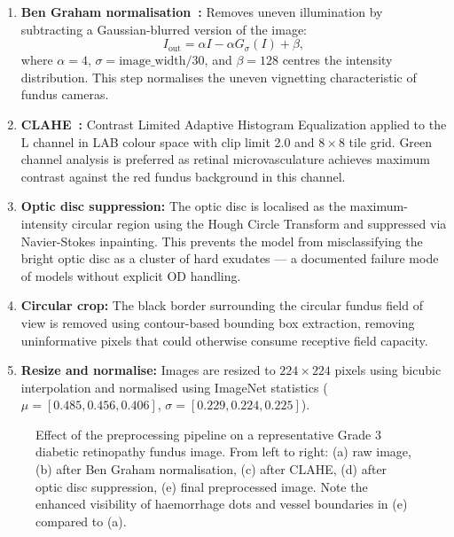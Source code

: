 \documentclass[review,12pt]{elsarticle}
\begin{document}
\begin{enumerate}
  \item \textbf{Ben Graham normalisation~\cite{graham2015}:} Removes uneven
  illumination by subtracting a Gaussian-blurred version of the image:
  \begin{equation}
    I_{\text{out}} = \alpha I - \alpha G_{\sigma}(I) + \beta,
    \label{eq:ben_graham}
  \end{equation}
  where $\alpha = 4$, $\sigma = \text{image\_width}/30$, and $\beta = 128$
  centres the intensity distribution. This step normalises the uneven
  vignetting characteristic of fundus cameras.

  \item \textbf{CLAHE~\cite{zuiderveld1994}:} Contrast Limited Adaptive
  Histogram Equalization applied to the L channel in LAB colour space with clip
  limit 2.0 and $8 \times 8$ tile grid. Green channel analysis is preferred as
  retinal microvasculature achieves maximum contrast against the red fundus
  background in this channel.

  \item \textbf{Optic disc suppression:} The optic disc is localised as the
  maximum-intensity circular region using the Hough Circle Transform and
  suppressed via Navier-Stokes inpainting. This prevents the model from
  misclassifying the bright optic disc as a cluster of hard exudates — a
  documented failure mode of models without explicit OD handling.

  \item \textbf{Circular crop:} The black border surrounding the circular
  fundus field of view is removed using contour-based bounding box extraction,
  removing uninformative pixels that could otherwise consume receptive field
  capacity.

  \item \textbf{Resize and normalise:} Images are resized to $224 \times 224$
  pixels using bicubic interpolation and normalised using ImageNet statistics
  ($\mu = [0.485, 0.456, 0.406]$, $\sigma = [0.229, 0.224, 0.225]$).
\end{enumerate}

\begin{figure}[htbp]
  \centering
  \caption{Effect of the preprocessing pipeline on a representative Grade 3
  diabetic retinopathy fundus image. From left to right: (a) raw image,
  (b) after Ben Graham normalisation, (c) after CLAHE, (d) after optic disc
  suppression, (e) final preprocessed image. Note the enhanced visibility of
  haemorrhage dots and vessel boundaries in (e) compared to (a).}
  \label{fig:preprocessing}
\end{figure}
\end{document}
